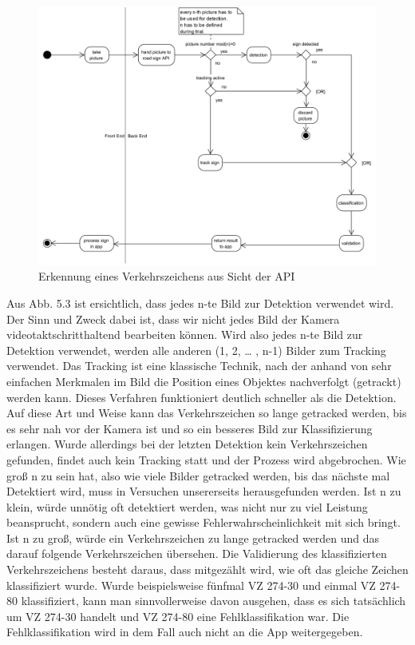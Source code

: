 \documentclass[12pt,a4paper,ngerman,enabledeprecatedfontcommands]{scrreprt}
\begin{document}
\begin{figure}[H]
\centering
\includegraphics[width=1\linewidth]{Grafiken/Activity_Diagram.png}
\caption{Erkennung eines Verkehrszeichens aus Sicht der \gls{API}}
\end{figure}

Aus Abb. 5.3 ist ersichtlich, dass jedes n-te Bild zur \gls{Detektion} verwendet wird. Der Sinn und Zweck dabei ist, dass wir nicht jedes Bild der Kamera videotaktschritthaltend bearbeiten können. Wird also jedes n-te Bild zur \gls{Detektion} verwendet, werden alle anderen (1, 2, … , n-1) Bilder zum \gls{Tracking} verwendet.
Das \gls{Tracking} ist eine klassische Technik, nach der anhand von sehr einfachen Merkmalen im Bild die Position eines Objektes nachverfolgt (getrackt) werden kann. Dieses Verfahren funktioniert deutlich schneller als die \gls{Detektion}. Auf diese Art und Weise kann das Verkehrszeichen so lange getracked werden,  bis es sehr nah vor der Kamera ist und so ein besseres Bild zur Klassifizierung erlangen. Wurde allerdings bei der letzten \gls{Detektion} kein Verkehrszeichen gefunden, findet auch kein \gls{Tracking} statt und der Prozess wird abgebrochen.
Wie groß n zu sein hat, also wie viele Bilder getracked werden, bis das nächste mal Detektiert wird, muss in Versuchen unsererseits herausgefunden werden. Ist n zu klein, würde unnötig oft detektiert werden, was nicht nur zu viel Leistung beansprucht, sondern auch eine gewisse Fehlerwahrscheinlichkeit mit sich bringt. Ist n zu groß, würde ein Verkehrszeichen zu lange getracked werden und das darauf folgende Verkehrszeichen übersehen.
Die Validierung des klassifizierten Verkehrszeichens besteht daraus, dass mitgezählt wird, wie oft das gleiche Zeichen klassifiziert wurde. Wurde beispielsweise fünfmal \gls{VZ} 274-30 und einmal \gls{VZ} 274-80 klassifiziert, kann man sinnvollerweise davon ausgehen, dass es sich tatsächlich um \gls{VZ} 274-30 handelt und \gls{VZ} 274-80 eine Fehlklassifikation war. Die Fehlklassifikation wird in dem Fall auch nicht an die \gls{App} weitergegeben.
\end{document}
